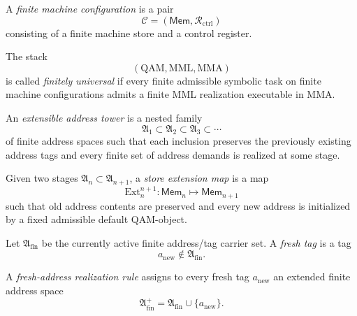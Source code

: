 \begin{definition}\label{def:finite-machine-configuration-computational-layer}
A \emph{finite machine configuration} is a pair
\[
\mathcal{C}=(\mathsf{Mem},\mathcal{R}_{\mathrm{ctrl}})
\]
consisting of a finite machine store and a control register.
\end{definition}

\begin{definition}\label{def:finite-universality-computational-layer}
The stack
\[
(\mathrm{QAM},\mathrm{MML},\mathrm{MMA})
\]
is called \emph{finitely universal} if every finite admissible symbolic task on finite machine configurations admits a finite MML realization executable in MMA.
\end{definition}

\begin{definition}\label{def:extensible-address-tower-computational-layer}
An \emph{extensible address tower} is a nested family
\[
\mathfrak{A}_1\subset\mathfrak{A}_2\subset\mathfrak{A}_3\subset\cdots
\]
of finite address spaces such that each inclusion preserves the previously existing address tags and every finite set of address demands is realized at some stage.
\end{definition}

\begin{definition}\label{def:store-extension-map-computational-layer}
Given two stages \(\mathfrak{A}_n\subset\mathfrak{A}_{n+1}\), a \emph{store extension map} is a map
\[
\mathrm{Ext}_{n}^{n+1}:\mathsf{Mem}_n\longmapsto \mathsf{Mem}_{n+1}
\]
such that old address contents are preserved and every new address is initialized by a fixed admissible default QAM-object.
\end{definition}

\begin{definition}\label{def:fresh-tag-computational-layer}
Let \(\mathfrak{A}_{\mathrm{fin}}\) be the currently active finite address/tag carrier set. A \emph{fresh tag} is a tag
\[
a_{\mathrm{new}}\notin\mathfrak{A}_{\mathrm{fin}}.
\]
\end{definition}

\begin{definition}\label{def:fresh-address-realization-rule-computational-layer}
A \emph{fresh-address realization rule} assigns to every fresh tag \(a_{\mathrm{new}}\) an extended finite address space
\[
\mathfrak{A}_{\mathrm{fin}}^{+}=\mathfrak{A}_{\mathrm{fin}}\cup\{a_{\mathrm{new}}\}.
\]
\end{definition}

